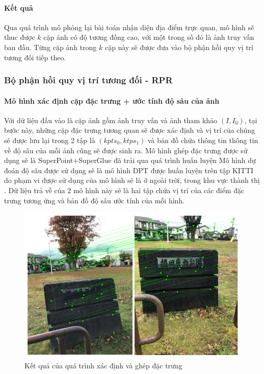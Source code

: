 \paragraph*{Kết quả}

Qua quá trình mô phỏng lại bài toán nhận diện địa điểm trực quan, mô hình sẽ thuc được $k$ cặp ảnh có độ tương đồng cao, với một trong số đó là ảnh truy vấn ban đầu. Từng cặp ảnh trong $k$ cặp này sẽ được đưa vào bộ phận hồi quy vị trí tương đối tiếp theo.

\subsubsection{Bộ phận hồi quy vị trí tương đối - RPR}
\paragraph*{Mô hình xác định cặp đặc trưng + ước tính độ sâu của ảnh}

Với dữ liệu đầu vào là cặp ảnh gồm ảnh truy vấn và ảnh tham khảo $(I,I_0)$, tại bước này, những cặp đặc trưng tương quan sẽ được xác định và vị trí của chúng sẽ được lưu lại trong 2 tập là $(kpts_0,ktps_1)$ và bản đồ chứa thông tin thông tin về độ sâu của mỗi ảnh cũng sẽ được sinh ra. Mô hình ghép đặc trưng được sử dụng sẽ là SuperPoint+SuperGlue \cite{sarlin2020superglue} đã trải qua quá trình huấn luyện Mô hình dự đoán độ sâu được sử dụng sẽ là mô hình DPT \cite{ranftl2021vision} được huấn luyện trên tập KITTI do phạm vi được sử dụng của mô hình sẽ là ở ngoài trời, trong khu vực thành thị \cite{arnold2022mapfree}. Dữ liệu trả về của 2 mô hình này sẽ là hai tập chứa vị trí của các điểm đặc trưng tương ứng và bản đồ độ sâu ước tính của mỗi hình.

\begin{figure}[H]
    \centering
    \includegraphics[scale=0.7]{pics/Proposal/matching.png}
    \caption{Kết quả của quá trình xác định và ghép đặc trưng}
\end{figure}

